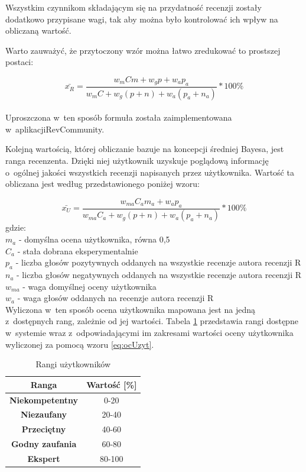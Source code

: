 Wszystkim czynnikom składającym się na przydatność recenzji zostały dodatkowo przypisane wagi, tak aby można było kontrolować ich wpływ na obliczaną wartość.

Warto zauważyć, że przytoczony wzór można łatwo zredukować to prostszej postaci:

\begin{equation}\label{eq:przydatnosc}
\bar{x_{R}}=\frac{w_{m}Cm+w_{g}{p}+w_{a}p_{a}}{w_{m}C+w_{g}(p+n)+w_{a}(p_{a}+n_{a})}*100\%
\end{equation}\\

Uproszczona w~ten sposób formuła została zaimplementowana w~aplikacji\linebreak RevCommunity.

Kolejną wartością, której obliczanie bazuje na koncepcji średniej Bayesa, jest ranga recenzenta. Dzięki niej użytkownik uzyskuje poglądową informację o~ogólnej jakości wszystkich recenzji napisanych przez użytkownika. Wartość ta obliczana jest według przedstawionego poniżej wzoru:

\begin{equation}\label{eq:ocUzyt}
\bar{x_{U}}=\frac{w_{ma}C_{a}m_{a}+w_{a}p_{a}}{w_{ma}C_{a}+w_{g}(p+n)+w_{a}(p_{a}+n_{a})}*100\%
\end{equation}
gdzie:\\
$m_{a}$ - domyślna ocena użytkownika, równa 0,5\\
$C_{a}$ - stała dobrana eksperymentalnie\\
$p_{a}$ - liczba głosów pozytywnych oddanych na wszystkie recenzje autora recenzji R\\
$n_{a}$ - liczba głosów negatywnych oddanych na wszystkie recenzje autora recenzji R\\
$w_{ma}$ - waga domyślnej oceny użytkownika\\
$w_{a}$ - waga głosów oddanych na recenzje autora recenzji R\\

Wyliczona w~ten sposób ocena użytkownika mapowana jest na jedną z~dostępnych rang, zależnie od jej wartości. Tabela \ref{tab:rangi} przedstawia rangi dostępne w~systemie wraz z~odpowiadającymi im zakresami wartości oceny użytkownika wyliczonej za pomocą wzoru \ref{eq:ocUzyt}.

\begin{table}[H]
\centering
\begin{tabular}{|c||c|}  
\hline
\textbf{Ranga} & \textbf{Wartość [\%]} \\
\hline\hline
\textbf{Niekompetentny} & 0-20 \\  
\hline
\textbf{Niezaufany} & 20-40 \\  
\hline
\textbf{Przeciętny} & 40-60 \\  
\hline
\textbf{Godny zaufania} & 60-80 \\  
\hline
\textbf{Ekspert} & 80-100 \\  
\hline
\end{tabular}
\caption{Rangi użytkowników}\label{tab:rangi}
\end{table}


